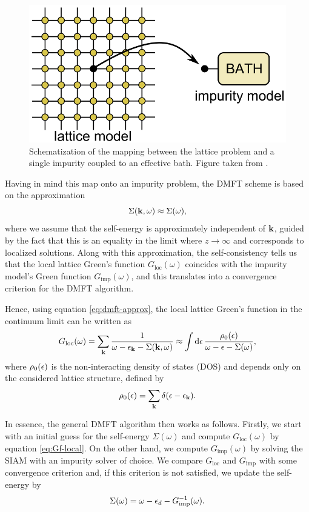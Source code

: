 \documentclass[12pt]{report}
\begin{document}
\begin{figure}[H]
\centering
\includegraphics[width=0.6\linewidth]{fig/dmft-mapping}
\caption{Schematization of the mapping between the lattice problem and a single impurity coupled to an effective bath. Figure taken from \cite{thesis_dmft_graz}.}
\label{fig:dmft-mapping}
\end{figure}

Having in mind this map onto an impurity problem, the DMFT scheme is based on the approximation
\begin{equation} \label{eq:dmft-approx}
\Sigma({\vb{k}}, \omega) \approx \Sigma(\omega),
\end{equation}
where we assume that the self-energy is approximately independent of ${\vb{k}}$, guided by the fact that this is an equality in the limit where $z \to \infty$ and corresponds to localized solutions. Along with this approximation, the self-consistency tells us that the local lattice Green's function $G_{\text{loc}}(\omega)$ coincides with the impurity model's Green function $G_{\text{imp}}(\omega)$, and this translates into a convergence criterion for the DMFT algorithm.

Hence, using equation \ref{eq:dmft-approx}, the local lattice Green's function in the continuum limit can be written as
\begin{equation} \label{eq:Gf-local}
G_{\text{loc}}(\omega) = \sum_{{\vb{k}}} \frac{1}{\omega-\epsilon_{\vb{k}}-\Sigma({\vb{k}}, \omega)} \approx
\int \dd{\epsilon} \frac{\rho_0(\epsilon)}{\omega - \epsilon - \Sigma(\omega)},
\end{equation}
where $\rho_0(\epsilon)$ is the non-interacting density of states (DOS) and depends only on the considered lattice structure, defined by
$$
\rho_0(\epsilon) = \sum_{{\vb{k}}} \delta(\epsilon-\epsilon_{\vb{k}}).
$$

In essence, the general DMFT algorithm then works as follows. Firstly, we start with an initial guess for the self-energy $\Sigma(\omega)$ and compute $G_{\text{loc}}(\omega)$ by equation \ref{eq:Gf-local}. On the other hand, we compute $G_{\text{imp}}(\omega)$ by solving the SIAM with an impurity solver of choice. We compare $G_{\text{loc}}$ and $G_{\text{imp}}$ with some convergence criterion and, if this criterion is not satisfied, we update the self-energy by
\begin{equation} \label{eq:self-energy-update}
\Sigma(\omega) = \omega - \epsilon_d - G_{\text{imp}}^{-1}(\omega).
\end{equation}
\end{document}
